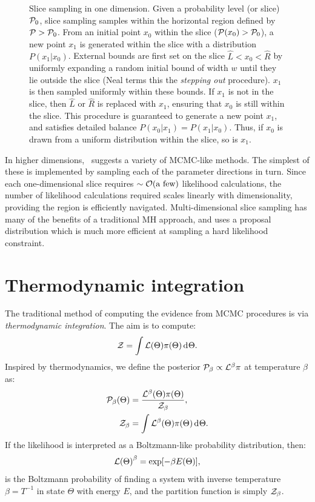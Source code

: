 \begin{figure}[ht]
  \caption{Slice sampling in one dimension. 
    Given a probability level (or slice) $\mathcal{P}_0$, slice sampling samples within the horizontal region defined by $\mathcal{P}>\mathcal{P}_0$. 
    From an initial point $x_0$ within the slice ($\mathcal{P}(x_0)>\mathcal{P}_0$), a new point $x_1$ is generated within the slice with a distribution $P(x_1|x_0)$.
    External bounds are first set on the slice $\hat{L}<x_0<\hat{R}$ by uniformly expanding a random initial bound of width $w$ until they lie outside the slice (Neal terms this the {\em stepping out\/} procedure). 
    $x_1$ is then sampled uniformly within these bounds.  
    If $x_1$ is not in the slice, then $\hat{L}$ or $\hat{R}$ is replaced with $x_1$, ensuring that $x_0$ is still within the slice.
    This procedure is guaranteed to generate a new point $x_1$, and satisfies detailed balance $P(x_0|x_1) = P(x_1|x_0)$. Thus, if $x_0$ is drawn from a uniform distribution within the slice, so is $x_1$.\label{fig:bay:1d_slice}
  }
\end{figure}



In higher dimensions,~\cite{NealSlice} suggests a variety of MCMC-like methods. The simplest of these is implemented by sampling each of the parameter directions in turn. Since each one-dimensional slice requires ${\sim\mathcal{O}{\left(\text{a few}\right)}}$ likelihood calculations, the number of likelihood calculations required scales linearly with dimensionality, providing the region is efficiently navigated. Multi-dimensional slice sampling has many of the benefits of a traditional MH approach, and uses a proposal distribution which is much more efficient at sampling a hard likelihood constraint.

\section{Thermodynamic integration}
The traditional method of computing the evidence from MCMC procedures is via {\em thermodynamic integration}.
The aim is to compute:
\begin{equation}
  \mathcal{Z} = \int \mathcal{L}(\Theta) \pi(\Theta) \operatorname{d}^{}\!{\Theta}.
\end{equation}
Inspired by thermodynamics, we define the posterior $\mathcal{P}_\beta \propto \mathcal{L}^\beta\pi$ at temperature $\beta$ as:
\begin{align}
  \mathcal{P}_\beta(\Theta) &= \frac{\mathcal{L}^{\beta}(\Theta) \pi(\Theta)}{\mathcal{Z}_\beta}, 
  \label{eqn:bay:posteriorb}
  \\
  \mathcal{Z}_\beta &= \int\mathcal{L}^{\beta}(\Theta) \pi(\Theta) \operatorname{d}^{}\!{\Theta}.
  \label{eqn:bay:evb}
\end{align}
If the likelihood is interpreted as a Boltzmann-like probability distribution, then:
\begin{equation}
{\mathcal{L}(\Theta)}^\beta = \exp[-\beta E(\Theta)],
\end{equation}
is the Boltzmann probability of finding a system with inverse temperature $\beta = T^{-1}$ in state $\Theta$ with energy $E$, and the partition function is simply $\mathcal{Z}_\beta$.

